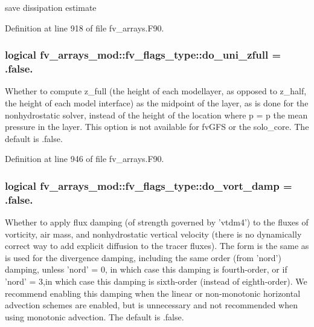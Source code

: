 save dissipation estimate 



Definition at line 918 of file fv\-\_\-arrays.\-F90.

\subsubsection[{do\-\_\-uni\-\_\-zfull}]{\setlength{\rightskip}{0pt plus 5cm}logical fv\-\_\-arrays\-\_\-mod\-::fv\-\_\-flags\-\_\-type\-::do\-\_\-uni\-\_\-zfull = .false.}\label{structfv__arrays__mod_1_1fv__flags__type_a0659d7f4aeb76e04aa09f877e976fe48}


Whether to compute z\-\_\-full (the height of each modellayer, as opposed to z\-\_\-half, the height of each model interface) as the midpoint of the layer, as is done for the nonhydrostatic solver, instead of the height of the location where p = p the mean pressure in the layer. This option is not available for fv\-G\-F\-S or the solo\-\_\-core. The default is .false. 



Definition at line 946 of file fv\-\_\-arrays.\-F90.

\subsubsection[{do\-\_\-vort\-\_\-damp}]{\setlength{\rightskip}{0pt plus 5cm}logical fv\-\_\-arrays\-\_\-mod\-::fv\-\_\-flags\-\_\-type\-::do\-\_\-vort\-\_\-damp = .false.}\label{structfv__arrays__mod_1_1fv__flags__type_a06034f559635e41927ab1fc2de52c821}


Whether to apply flux damping (of strength governed by 'vtdm4') to the fluxes of vorticity, air mass, and nonhydrostatic vertical velocity (there is no dynamically correct way to add explicit diffusion to the tracer fluxes). The form is the same as is used for the divergence damping, including the same order (from 'nord') damping, unless 'nord' = 0, in which case this damping is fourth-\/order, or if 'nord' = 3,in which case this damping is sixth-\/order (instead of eighth-\/order). We recommend enabling this damping when the linear or non-\/monotonic horizontal advection schemes are enabled, but is unnecessary and not recommended when using monotonic advection. The default is .false. 



